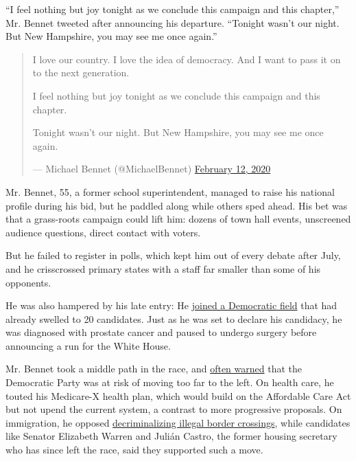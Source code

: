 ``I feel nothing but joy tonight as we conclude this campaign and this
chapter,'' Mr. Bennet tweeted after announcing his departure. ``Tonight
wasn't our night. But New Hampshire, you may see me once again.''

\begin{quote}
I love our country. I love the idea of democracy. And I want to pass it
on to the next generation.

I feel nothing but joy tonight as we conclude this campaign and this
chapter.

Tonight wasn't our night. But New Hampshire, you may see me once again.

--- Michael Bennet (@MichaelBennet)
\href{https://twitter.com/MichaelBennet/status/1227420272476684290?ref_src=twsrc\%5Etfw}{February
12, 2020}
\end{quote}

Mr. Bennet, 55, a former school superintendent, managed to raise his
national profile during his bid, but he paddled along while others sped
ahead. His bet was that a grass-roots campaign could lift him: dozens of
town hall events, unscreened audience questions, direct contact with
voters.

But he failed to register in polls, which kept him out of every debate
after July, and he crisscrossed primary states with a staff far smaller
than some of his opponents.

He was also hampered by his late entry: He
\href{https://www.nytimes3xbfgragh.onion/2019/05/02/us/michael-bennet-president-2020.html}{joined
a Democratic field} that had already swelled to 20 candidates. Just as
he was set to declare his candidacy, he was diagnosed with prostate
cancer and paused to undergo surgery before announcing a run for the
White House.

Mr. Bennet took a middle path in the race, and
\href{https://coloradosun.com/2019/07/31/michael-bennet-president-2020-democratic-primary/}{often
warned} that the Democratic Party was at risk of moving too far to the
left. On health care, he touted his Medicare-X health plan, which would
build on the Affordable Care Act but not upend the current system, a
contrast to more progressive proposals. On immigration, he opposed
\href{https://www.nytimes3xbfgragh.onion/2019/07/31/us/border-crossing-decriminalization.html}{decriminalizing
illegal border crossings}, while candidates like Senator Elizabeth
Warren and Julián Castro, the former housing secretary who has since
left the race, said they supported such a move.

